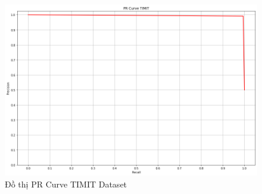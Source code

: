 \documentclass{article}
\begin{document}
	\begin{figure}[H]
		\centering
		\includegraphics[width=.75\textwidth]{result/pr_curve_timit.png}
		\caption{Đồ thị PR Curve TIMIT Dataset}
		\label{fig:writing-thesis}
	\end{figure}
\end{document}
